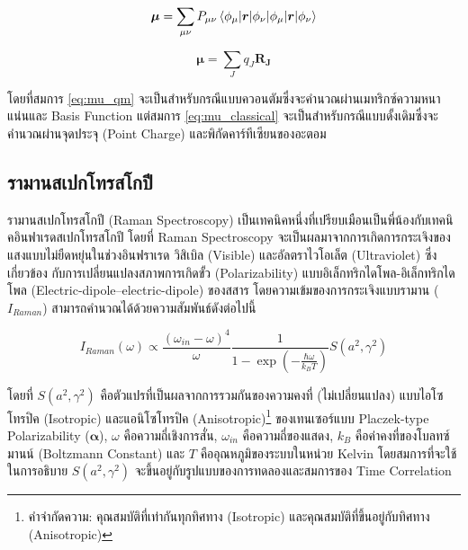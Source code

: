 \begin{equation}\label{eq:mu_qm}
    \bm{\mu}= \sum_{\mu\nu} P_{\mu\nu} \braket{\phi_{\mu}|\bm{r}|\phi_{\nu}}
\end{equation}

\begin{equation}\label{eq:mu_classical}
    \bm{\mu}=\sum_{J} q_J \bm{R_J}
\end{equation}

โดยที่สมการ \ref{eq:mu_qm} จะเป็นสำหรับกรณีแบบควอนตัมซึ่งจะคำนวณผ่านเมทริกซ์ความหนาแน่นและ Basis Function แต่สมการ 
\ref{eq:mu_classical} จะเป็นสำหรับกรณีแบบดั้งเดิมซึ่งจะคำนวณผ่านจุดประจุ (Point Charge) และพิกัดคาร์ทีเซียนของอะตอม

\subsection{รามานสเปกโทรสโกปี}
\label{ssec:raman_spectro}

รามานสเปกโทรสโกปี (Raman Spectroscopy) เป็นเทคนิคหนึ่งที่เปรียบเมือนเป็นพี่น้องกับเทคนิคอินฟาเรดสเปกโทรสโกปี โดยที่ Raman Spectroscopy 
จะเป็นผลมาจากการเกิดการกระเจิงของแสงแบบไม่ยืดหยุ่นในช่วงอินฟราเรด วิสิเบิล (Visible) และอัลตราไวโอเล็ต (Ultraviolet) ซึ่งเกี่ยวข้อง%
กับการเปลี่ยนแปลงสภาพการเกิดขั้ว (Polarizability) แบบอิเล็กทริกไดโพล-อิเล็กทริกไดโพล (Electric-dipole--electric-dipole) 
ของสสาร โดยความเข้มของการกระเจิงแบบรามาน ($I_{Raman}$) สามารถคำนวณได้ด้วยความสัมพันธ์ดังต่อไปนี้\autocite{thomas2013}

\begin{equation}\label{eq:Raman_corr}
    I_{Raman} (\omega) \propto \frac{(\omega_{in}-\omega)^4}{\omega} 
    \frac{1}{1-\exp(-\frac{\hbar\omega}{k_{B}T})}S(a^{2}, \gamma^{2})
\end{equation}

\noindent โดยที่ $S(a^{2}, \gamma^{2})$ คือตัวแปรที่เป็นผลจากการรวมกันของความคงที่ (ไม่เปลี่ยนแปลง) แบบไอโซโทรปิค (Isotropic) 
และแอนิโซโทรปิค (Anisotropic)\footnote{คำจำกัดความ: คุณสมบัติที่เท่ากันทุกทิศทาง (Isotropic) และคุณสมบัติที่ขึ้นอยู่กับทิศทาง 
(Anisotropic)} ของเทนเซอร์แบบ Placzek-type Polarizability ($\bm{\alpha}$)\autocite{jensen2005}, $\omega$ 
คือความถี่เชิงการสั่น, $\omega_{in}$ คือความถี่ของแสดง, $k_{B}$ คือค่าคงที่ของโบลทซ์มานน์ (Boltzmann Constant) และ $T$ 
คืออุณหภูมิของระบบในหน่วย Kelvin โดยสมการที่จะใช้ในการอธิบาย $S(a^{2}, \gamma^{2})$ จะขึ้นอยู่กับรูปแบบของการทดลองและสมการของ 
Time Correlation\autocite{mattiat2021}

